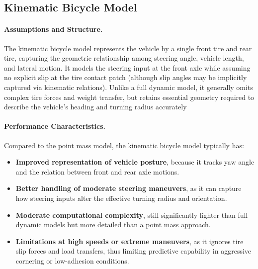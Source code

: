 \subsection*{Kinematic Bicycle Model}

\paragraph{Assumptions and Structure.}
The kinematic bicycle model represents the vehicle by a single front tire and rear tire, capturing the geometric relationship among steering angle,
vehicle length, and lateral motion.
It models the steering input at the front axle while assuming no explicit slip at the tire contact patch (although slip angles may be implicitly
captured via kinematic relations).
Unlike a full dynamic model, it generally omits complex tire forces and weight transfer, but retains essential geometry required to describe the
vehicle’s heading and turning radius accurately

\paragraph{Performance Characteristics.
}
Compared to the point mass model, the kinematic bicycle model typically has:
\begin{itemize}
	\item \textbf{Improved representation of vehicle posture}, because it
	      tracks yaw angle and the relation between front and rear axle motions.
	\item \textbf{Better handling of moderate steering maneuvers}, as it
	      can capture how steering inputs alter the effective turning radius
	      and orientation.
	\item \textbf{Moderate computational complexity}, still significantly
	      lighter than full dynamic models but more detailed than
	      a point mass approach.
	\item \textbf{Limitations at high speeds or extreme maneuvers}, as it
	      ignores tire slip forces and load transfers, thus limiting
	      predictive capability in aggressive cornering or low-adhesion
	      conditions.
\end{itemize}